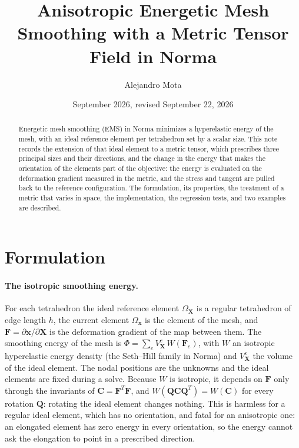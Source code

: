 \documentclass[11pt]{article}
\title{Anisotropic Energetic Mesh Smoothing with a Metric Tensor Field in Norma}
\author{Alejandro Mota}
\date{September 2026, revised September 22, 2026}
\newcommand{\bs}[1]{\boldsymbol{#1}}
\begin{document}
\maketitle

\begin{abstract}
Energetic mesh smoothing (EMS) in Norma minimizes a hyperelastic energy of the
mesh, with an ideal reference element per tetrahedron set by a scalar size.
This note records the extension of that ideal element to a metric tensor,
which prescribes three principal sizes and their directions, and the change
in the energy that makes the orientation of the elements part of the
objective: the energy is evaluated on the deformation gradient measured in
the metric, and the stress and tangent are pulled back to the reference
configuration. The formulation, its properties, the treatment of a metric
that varies in space, the implementation, the regression tests, and two
examples are described.
\end{abstract}

\section{Formulation}
\label{sec:formulation}

\paragraph{The isotropic smoothing energy.} For each tetrahedron the ideal
reference element $\Omega_{\bs X}$ is a regular tetrahedron of edge length
$h$, the current element $\Omega_{\bs x}$ is the element of the mesh, and
$\bs F = \partial \bs x / \partial \bs X$ is the deformation gradient of the
map between them. The smoothing energy of the mesh is
$\Phi = \sum_e V_{\bs X}^e\, W(\bs F_e)$, with $W$ an isotropic
hyperelastic energy density (the Seth--Hill family in Norma) and
$V^e_{\bs X}$ the volume of the ideal element. The nodal positions are the
unknowns and the ideal elements are fixed during a solve. Because $W$ is
isotropic, it depends on $\bs F$ only through the invariants of
$\bs C = \bs F^T \bs F$, and $W(\bs Q \bs C \bs Q^T) = W(\bs C)$ for every
rotation $\bs Q$: rotating the ideal element changes nothing. This is
harmless for a regular ideal element, which has no orientation, and fatal
for an anisotropic one: an elongated element has zero energy in every
orientation, so the energy cannot ask the elongation to point in a
prescribed direction.
\end{document}
